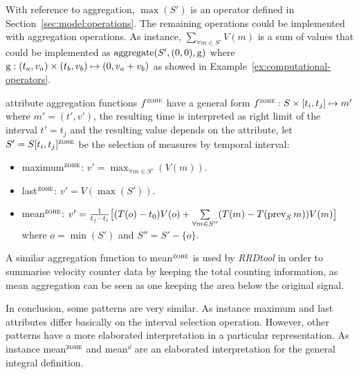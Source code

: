 With reference to  aggregation, $\max(S')$ is an operator
defined in Section~\ref{sec:model:operations}. The remaining
operations could be implemented with aggregation operations. As
instance, $\sum\limits_{\forall m \in S'} V(m)$ is a sum of values
that could be implemented as $\operatorname*{aggregate}(S',(0,0),\operatorname*{g})$ where $\operatorname*{g}:
(t_a,v_a) \times (t_b,v_b) \mapsto (0,v_a+v_b)$ as showed in
Example~\ref{ex:computational-operators}.



\zohe{} attribute aggregation functions $f^\zohe{}$ have a general
form $f^\zohe{} : S \times [t_i,t_j]\mapsto m'$ where $m'=(t',v')$,
the resulting time is interpreted as right limit of the interval
$t'=t_j$ and the resulting value depends on the attribute, let
$S'=S[t_i,t_j]^\zohe{}$ be the selection of measures by \zohe{} temporal
interval:
\begin{itemize}
\item maximum$^\zohe{}$: $v' = \max_{\forall m \in S'}(V(m))$. 
\item last$^\zohe{}$: $v' = V(\max(S'))$.
\item mean$^\zohe{}$: $v' = \frac{1}{t_j-t_i} \big[ (T(o)-t_0)V(o) +
  \sum\limits_{\forall m \in S''}( T(m)- T(\operatorname*{prev}_S
  m) )V(m) \big]$ where $o=\min(S')$ and $S''= S' - \{o\}$.
\end{itemize}

A similar aggregation function to mean$^\zohe{}$ is used by \emph{RRDtool}
\cite{rrdtool} in order to summarise velocity coun\-ter
data by keeping the total counting information, as mean aggregation
can be seen as one keeping the area below the original signal.


In conclusion, some patterns are very similar. As instance maximum and
last attributes differ basically on the interval selection
operation. However, other patterns have a more elaborated
interpretation in a particular representation. As instance
mean$^\zohe{}$ and mean$^\dd$ are an elaborated interpretation for
the general integral definition.





